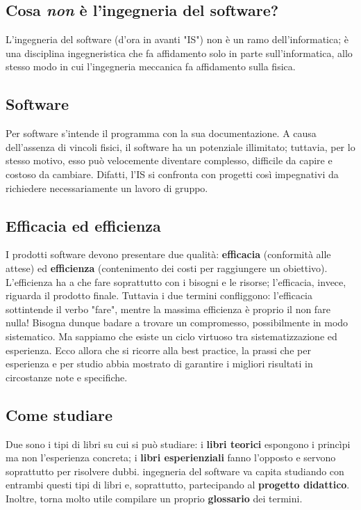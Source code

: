 \documentclass[a4paper]{article}
\begin{document}
		
	\subsection{Cosa \emph{non} è l'ingegneria del software?}

		
L'ingegneria del software (d'ora in avanti "IS") non è un ramo dell'informatica; è una disciplina ingegneristica che fa affidamento solo in parte sull'informatica, allo stesso modo in cui l'ingegneria meccanica fa affidamento sulla fisica.

		
	\subsection{Software}

		
Per software s'intende il programma con la sua documentazione. A causa dell'assenza di vincoli fisici, il software ha un potenziale illimitato; tuttavia, per lo stesso motivo, esso può velocemente diventare complesso, difficile da capire e costoso da cambiare. Difatti, l'IS si confronta con progetti così impegnativi da richiedere necessariamente un lavoro di gruppo.

		
	\subsection{Efficacia ed efficienza}

		
I prodotti software devono presentare due qualità: \textbf{efficacia} (conformità alle attese) ed \textbf{efficienza} (contenimento dei costi per raggiungere un obiettivo). L'efficienza ha a che fare soprattutto con i bisogni e le risorse; l'efficacia, invece, riguarda il prodotto finale. Tuttavia i due termini confliggono: l'efficacia sottintende il verbo "fare", mentre la massima efficienza è proprio il non fare nulla! Bisogna dunque badare a trovare un compromesso, possibilmente in modo sistematico. Ma sappiamo che esiste un ciclo virtuoso tra sistematizzazione ed esperienza. Ecco allora che si ricorre alla best practice, la prassi che per esperienza e per studio abbia mostrato di garantire i migliori risultati in circostanze note e specifiche.

		
	\subsection{Come studiare}

		
Due sono i tipi di libri su cui si può studiare: i \textbf{libri teorici} espongono i princìpi ma non l'esperienza concreta; i \textbf{libri esperienziali} fanno l'opposto e servono soprattutto per risolvere dubbi. ingegneria del software va capita studiando con entrambi questi tipi di libri e, soprattutto, partecipando al \textbf{progetto didattico}. Inoltre, torna molto utile compilare un proprio \textbf{glossario} dei termini.
	
\end{document}
